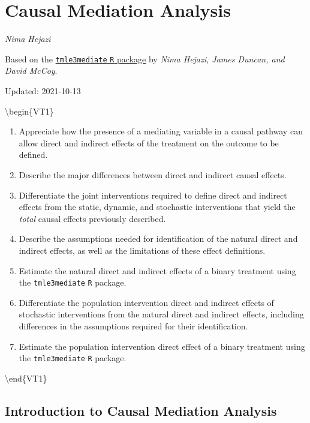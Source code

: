 \documentclass[
  12pt, krantz2,
]{krantz}
\newcommand{\passthrough}[1]{#1}
\providecommand{\tightlist}{%
  \setlength{\itemsep}{0pt}\setlength{\parskip}{0pt}}
\theoremstyle{definition}
\theoremstyle{definition}
\theoremstyle{definition}
\newcommand{\1}{\mathbbm{1}}
\begin{document}
\hypertarget{causal-mediation-analysis}{%
\chapter{Causal Mediation Analysis}\label{causal-mediation-analysis}}

\emph{Nima Hejazi}

Based on the \href{https://github.com/tlverse/tmle3mediate}{\passthrough{\lstinline!tmle3mediate!} \passthrough{\lstinline!R!}
package} by \emph{Nima Hejazi, James
Duncan, and David McCoy}.

Updated: 2021-10-13

\textbackslash begin\{VT1\}

\begin{enumerate}
\def\labelenumi{\arabic{enumi}.}
\tightlist
\item
  Appreciate how the presence of a mediating variable in a causal pathway can
  allow direct and indirect effects of the treatment on the outcome to be
  defined.
\item
  Describe the major differences between direct and indirect causal effects.
\item
  Differentiate the joint interventions required to define direct and indirect
  effects from the static, dynamic, and stochastic interventions that yield
  the \emph{total} causal effects previously described.
\item
  Describe the assumptions needed for identification of the natural direct and
  indirect effects, as well as the limitations of these effect definitions.
\item
  Estimate the natural direct and indirect effects of a binary treatment using
  the \passthrough{\lstinline!tmle3mediate!} \passthrough{\lstinline!R!} package.
\item
  Differentiate the population intervention direct and indirect effects of
  stochastic interventions from the natural direct and indirect effects,
  including differences in the assumptions required for their identification.
\item
  Estimate the population intervention direct effect of a binary treatment
  using the \passthrough{\lstinline!tmle3mediate!} \passthrough{\lstinline!R!} package.
\end{enumerate}

\textbackslash end\{VT1\}

\hypertarget{introduction-to-causal-mediation-analysis}{%
\section{Introduction to Causal Mediation Analysis}\label{introduction-to-causal-mediation-analysis}}
\end{document}
